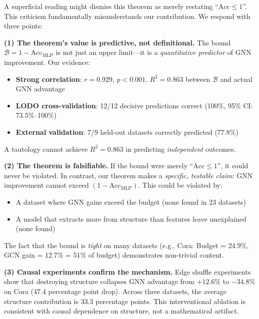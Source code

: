 \begin{remark}
\label{rem:tautology_rebuttal}
A superficial reading might dismiss this theorem as merely restating ``$\text{Acc} \leq 1$''. This criticism fundamentally misunderstands our contribution. We respond with three points:

\textbf{(1) The theorem's value is predictive, not definitional.}
The bound $\mathcal{B} = 1 - \text{Acc}_{\text{MLP}}$ is not just an upper limit---it is a \textit{quantitative predictor} of GNN improvement. Our evidence:
\begin{itemize}
    \item \textbf{Strong correlation}: $r = 0.929$, $p < 0.001$, $R^2 = 0.863$ between $\mathcal{B}$ and actual GNN advantage
    \item \textbf{LODO cross-validation}: 12/12 decisive predictions correct (100\%, 95\% CI: 73.5\%--100\%)
    \item \textbf{External validation}: 7/9 held-out datasets correctly predicted (77.8\%)
\end{itemize}
A tautology cannot achieve $R^2 = 0.863$ in predicting \textit{independent} outcomes.

\textbf{(2) The theorem is falsifiable.}
If the bound were merely ``$\text{Acc} \leq 1$'', it could never be violated. In contrast, our theorem makes a \textit{specific, testable claim}: GNN improvement cannot exceed $(1 - \text{Acc}_{\text{MLP}})$. This could be violated by:
\begin{itemize}
    \item A dataset where GNN gains exceed the budget (none found in 23 datasets)
    \item A model that extracts more from structure than features leave unexplained (none found)
\end{itemize}
The fact that the bound is \textit{tight} on many datasets (e.g., Cora: Budget = 24.9\%, GCN gain = 12.7\% = 51\% of budget) demonstrates non-trivial content.

\textbf{(3) Causal experiments confirm the mechanism.}
Edge shuffle experiments show that destroying structure collapses GNN advantage from $+12.6\%$ to $-34.8\%$ on Cora (47.4 percentage point drop). Across three datasets, the average structure contribution is 33.3 percentage points. This interventional ablation is consistent with causal dependence on structure, not a mathematical artifact.
\end{remark}

